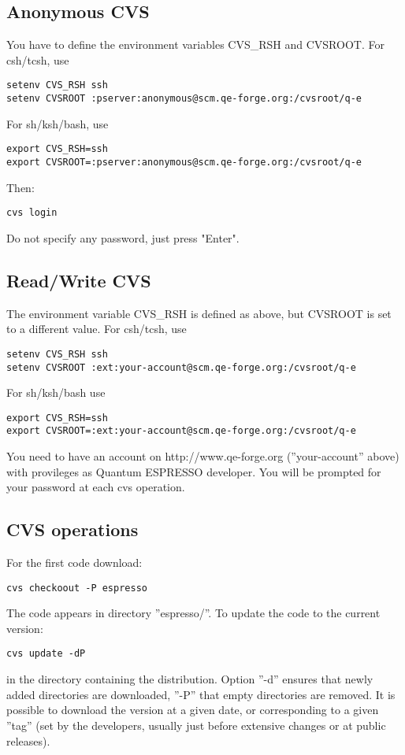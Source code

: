 \documentclass[12pt,a4paper]{article}
\begin{document}
\subsection{Anonymous CVS}

You have to define the environment variables CVS\_RSH and CVSROOT.
For csh/tcsh, use
\begin{verbatim}
setenv CVS_RSH ssh
setenv CVSROOT :pserver:anonymous@scm.qe-forge.org:/cvsroot/q-e
\end{verbatim}
For sh/ksh/bash, use
\begin{verbatim}
export CVS_RSH=ssh
export CVSROOT=:pserver:anonymous@scm.qe-forge.org:/cvsroot/q-e 
\end{verbatim}
Then:
\begin{verbatim}
cvs login
\end{verbatim}
Do not specify any password, just press "Enter".

\subsection{Read/Write CVS}

The environment variable CVS\_RSH is defined as above, but CVSROOT is
set to a different value. For csh/tcsh, use
\begin{verbatim}
setenv CVS_RSH ssh
setenv CVSROOT :ext:your-account@scm.qe-forge.org:/cvsroot/q-e 
\end{verbatim}
For sh/ksh/bash use
\begin{verbatim}
export CVS_RSH=ssh
export CVSROOT=:ext:your-account@scm.qe-forge.org:/cvsroot/q-e 
\end{verbatim}
You need to have an account on http://www.qe-forge.org
(''your-account'' above) with provileges as Quantum ESPRESSO developer.
You will be prompted for your password at each cvs operation.

\subsection{CVS operations}

For the first code download:
\begin{verbatim}
cvs checkoout -P espresso
\end{verbatim}
The code appears in directory ''espresso/''. To update the code to the
current version: 
\begin{verbatim}
cvs update -dP
\end{verbatim}
in the directory containing the distribution. Option ''-d'' ensures
that newly added directories are downloaded, ''-P'' that empty
directories are removed.  It is possible to download the version at a
given date, or corresponding to  a given ''tag''  (set by the
developers, usually just before extensive changes or at public
releases). 
\end{document}
